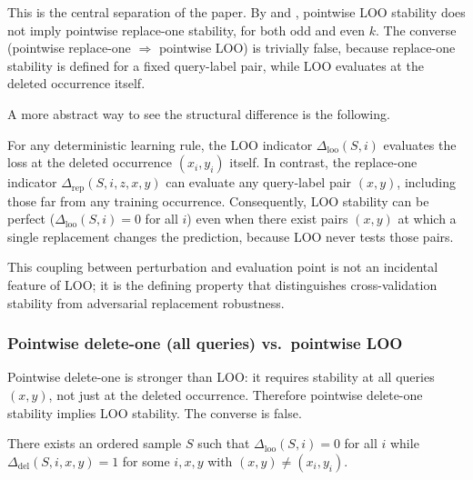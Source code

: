 This is the central separation of the paper. By 
and , pointwise LOO stability does not imply
pointwise replace-one stability, for both odd and even $k$. The converse
(pointwise replace-one $\Rightarrow$ pointwise LOO) is trivially false,
because replace-one stability is defined for a fixed query-label pair, while
LOO evaluates at the deleted occurrence itself.

A more abstract way to see the structural difference is the following.

\begin{proposition}
\label{prop:loo-coupling}
For any deterministic learning rule, the LOO indicator
$\Delta_{\mathrm{loo}}(S,i)$ evaluates the loss at the deleted occurrence
$(x_i, y_i)$ itself. In contrast, the replace-one indicator
$\Delta_{\mathrm{rep}}(S,i,z,x,y)$ can evaluate any query-label pair
$(x,y)$, including those far from any training occurrence. Consequently, LOO
stability can be perfect ($\Delta_{\mathrm{loo}}(S,i)=0$ for all $i$) even
when there exist pairs $(x,y)$ at which a single replacement changes the
prediction, because LOO never tests those pairs.
\end{proposition}

This coupling between perturbation and evaluation point is not an incidental
feature of LOO; it is the defining property that distinguishes cross-validation
stability from adversarial replacement robustness.

\subsubsection{Pointwise delete-one (all queries) vs.\ pointwise LOO}

Pointwise delete-one is stronger than LOO: it requires stability at all
queries $(x,y)$, not just at the deleted occurrence. Therefore pointwise
delete-one stability implies LOO stability. The converse is false.

\begin{proposition}
\label{prop:loo-not-impl-del}
There exists an ordered sample $S$ such that
$\Delta_{\mathrm{loo}}(S,i) = 0$ for all $i$ while
$\Delta_{\mathrm{del}}(S,i,x,y) = 1$ for some $i,x,y$ with
$(x,y) \neq (x_i,y_i)$.
\end{proposition}

